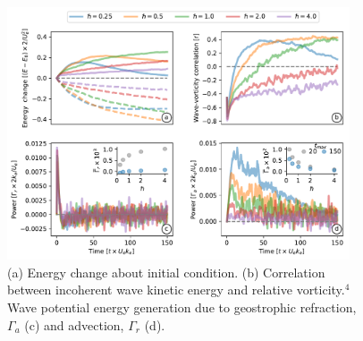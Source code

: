 \documentclass[final]{beamer}
\begin{document}
\begin{frame}[t]
\begin{columns}[t]
\begin{column}{0.55\textwidth}
\begin{columns}
\begin{column}{.475\textwidth}
                        \begin{figure}
                          \includegraphics[width=0.95\textwidth]{figs/hslash_dependence_turbulence.pdf}
                          \caption{(a) Energy change about initial condition.
                                  (b)  Correlation between
                                  incoherent wave
                                  kinetic energy and relative vorticity.$^4$ Wave potential
                                  energy generation
                                  due to geostrophic refraction, $\Gamma_a$ (c) and advection, $\Gamma_r$ (d).}
                        \end{figure}

                      \end{column}

                      \hspace{0.cm}

                      \begin{column}{0.475\textwidth}


\end{column}
\end{columns}
\end{column}
\end{columns}
\end{frame}
\end{document}
